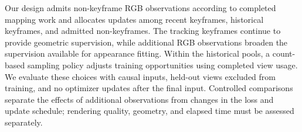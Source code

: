 Our design admits non-keyframe RGB observations according to completed mapping
work and allocates updates among recent keyframes, historical keyframes, and
admitted non-keyframes. The tracking keyframes continue to provide geometric
supervision, while additional RGB observations broaden the supervision
available for appearance fitting. Within the historical pools, a count-based
sampling policy adjusts training opportunities using completed view usage.
We evaluate these choices with causal inputs, held-out views excluded from
training, and no optimizer updates after the final input. Controlled
comparisons separate the effects of additional observations from changes in
the loss and update schedule; rendering quality, geometry, and elapsed time
must be assessed separately.

